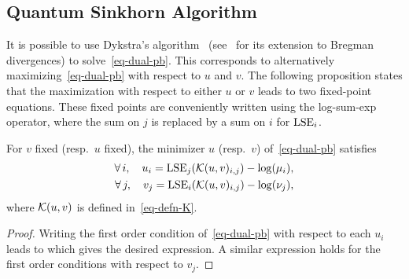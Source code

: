 \subsection{Quantum Sinkhorn Algorithm}

It is possible to use Dykstra's algorithm~\cite{Dykstra83} (see~\cite{bauschke-lewis} for its extension to Bregman divergences) to solve~\eqref{eq-dual-pb}. This corresponds to alternatively maximizing~\eqref{eq-dual-pb} with respect to $u$ and $v$. 
%
The following proposition states that the maximization with respect to either $u$ or $v$ leads to two fixed-point equations. 
%
These fixed points are conveniently written using the log-sum-exp operator, 
where the sum on $j$ is replaced by a sum on $i$ for $\operatorname{LSE}_i$. 

\begin{prop}\label{prop-fixed-points}
	For $v$ fixed (resp.\ $u$ fixed), the minimizer $u$ (resp.\ $v$) of~\eqref{eq-dual-pb} satisfies
	\begin{align}\label{eq-fixed-point-u}
		\forall \, i, \quad u_i = \operatorname{LSE}_j(\mathcal{K}(u,v)_{i,j})-\log(\mu_i), \\
		\forall \, j, \quad v_j = \operatorname{LSE}_i(\mathcal{K}(u,v)_{i,j})-\log(\nu_j), \label{eq-fixed-point-v}
	\end{align}
	where $\mathcal{K}(u,v)$ is defined in~\eqref{eq-defn-K}.
\end{prop}
\begin{proof}
	Writing the first order condition of~\eqref{eq-dual-pb} with respect to each $u_i$ leads to
	which gives the desired expression. A similar expression holds for the first order conditions with respect to $v_j$.
\end{proof}



